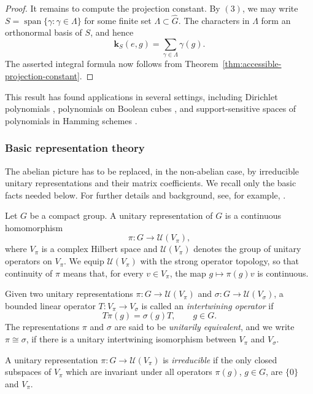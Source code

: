 \documentclass[11pt,showkeys]{amsart}
\begin{document}
\begin{proof}
It remains to compute the projection constant. By \((3)\), we may write
\(S=\operatorname{span}\{\gamma:\gamma\in\Lambda\}\) for some finite
set \(\Lambda\subset\widehat G\). The characters in \(\Lambda\) form
an orthonormal basis of \(S\), and hence
\[
        \mathbf k_S(e,g)
        =
        \sum_{\gamma\in\Lambda}\gamma(g).
\]
The asserted integral formula now follows from
Theorem~\ref{thm:accessible-projection-constant}.
\end{proof}
This result has found applications in several settings, including
Dirichlet polynomials \cite{defant2024projection}, polynomials on Boolean cubes
\cite{defant2024asymptotic}, and support-sensitive  spaces of polynomials in Hamming schemes
\cite{defant2026support}.







\subsubsection{Basic representation theory}

\label{Basic representation theory}

The abelian picture has to be replaced, in the non-abelian case, by
 irreducible unitary representations and their matrix
coefficients. We recall only the basic facts needed below. For further details and background, see, for example, \cite{folland2016course}.


Let \(G\) be a compact group. A unitary representation of \(G\) is a
continuous homomorphism
\[
        \pi:G\longrightarrow \mathcal U(V_\pi),
\]
where \(V_\pi\) is a complex Hilbert space and
\(\mathcal U(V_\pi)\) denotes the group of unitary operators on \(V_\pi\).
We equip \(\mathcal U(V_\pi)\) with the strong operator topology, so that
continuity of \(\pi\) means that, for every \(v\in V_\pi\), the map
\(g\mapsto\pi(g)v\) is continuous.

Given two unitary representations \(\pi:G\to\mathcal U(V_\pi)\) and
\(\sigma:G\to\mathcal U(V_\sigma)\), a bounded linear operator
\(T:V_\pi\to V_\sigma\) is called an \emph{intertwining operator} if
\[
        T\pi(g)=\sigma(g)T,
        \qquad g\in G.
\]
The representations \(\pi\) and \(\sigma\) are said to be \emph{unitarily
equivalent}, and we write \(\pi\cong\sigma\), if there is a unitary
intertwining isomorphism between \(V_\pi\) and \(V_\sigma\).


A unitary representation \(\pi:G\to\mathcal U(V_\pi)\) is \emph{irreducible} if
the only closed subspaces of \(V_\pi\) which are invariant under all
operators \(\pi(g)\), \(g\in G\), are \(\{0\}\) and \(V_\pi\).
\end{document}
